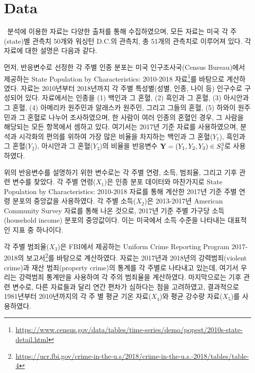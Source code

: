\section{Data}
\label{sec:dat}


\ \quad 분석에 이용한 자료는 다양한 출처를 통해 수집하였으며, 모든 자료는 미국 각 주(state)별 관측치 50개와 워싱턴 D.C.의 관측치, 총 51개의 관측치로 이루어져 있다. 각 자료에 대한 설명은 다음과 같다.

먼저, 반응변수로 선정한 각 주별 인종 분포는 미국 인구조사국(Census Bureau)에서 제공하는 State Population by Characteristics: 2010-2018 자료\footnote{\url{https://www.census.gov/data/tables/time-series/demo/popest/2010s-state-detail.html}}를 바탕으로 계산하였다. 자료는 2010년부터 2018년까지 각 주별 특성별(성별, 인종, 나이 등) 인구수로 구성되어 있다. 자료에서는 인종을 (1) 백인과 그 혼혈, (2) 흑인과 그 혼혈, (3) 아시안과 그 혼혈, (4) 아메리카 원주민과 알래스카 원주민, 그리고 그들의 혼혈, (5) 하와이 원주민과 그 혼혈로 나누어 조사하였으며, 한 사람이 여러 인종의 혼혈인 경우, 그 사람을 해당되는 모든 항목에서 셈하고 있다. 여기서는 2017년 기준 자료를 사용하였으며, 분석과 시각화의 편의를 위하여 가장 많은 비율을 차지하는 백인과 그 혼혈($Y_1$), 흑인과 그 혼혈($Y_2$), 아시안과 그 혼혈($Y_3$)의 비율을 반응변수 $\mathbf{Y} = (Y_1, Y_2,Y_3) \in S_1^3$로 사용하였다.

위의 반응변수를 설명하기 위한 변수로는 각 주별 연령, 소득, 범죄율, 그리고 기후 관련 변수를 찾았다. 각 주별 연령($X_1$)은 인종 분포 데이터와 마찬가지로  State Population by Characteristics: 2010-2018 자료를 통해 계산한 2017년 기준 주별 연령 분포의 중앙값을 사용하였다. 각 주별 소득($ X_2 $)은 2013-2017년 American Community Survey 자료를 통해 나온 것으로, 2017년 기준 주별 가구당 소득(household income) 분포의 중앙값이다. 이는 미국에서 소득 수준을 나타내는 대표적인 지표 중 하나이다.

각 주별 범죄율($ X_3 $)은 FBI에서 제공하는 Uniform Crime Reporting Program 2017-2018의 보고서\footnote{\url{https://ucr.fbi.gov/crime-in-the-u.s/2018/crime-in-the-u.s.-2018/tables/table-4}}를 바탕으로 계산하였다. 자료는 2017년과 2018년의 강력범죄(violent crime)과 재산 범죄(property crime)의 통계를 각 주별로 나타내고 있는데, 여기서 우리는 강력범죄 통계만을 사용하여 각 주의 범죄율을 계산하였다. 마지막으로는 기후 관련 변수로, 다른 자료들과 달리 연간 편차가 심하다는 점을 고려하였고, 결과적으로 1981년부터 2010년까지의 각 주 별 평균 기온 자료($ X_4 $)와 평균 강수량 자료($ X_5 $)를 사용하였다.


